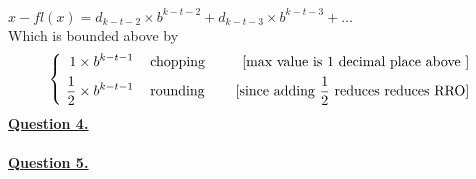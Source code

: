 \documentclass[12pt]{article}
\begin{document}
$x - fl(x) = d_{k-t-2} \times b^{k-t-2} + d_{k-t-3} \times b^{k-t-3} + \ldots $\\
Which is bounded above by $$
	\left\{
	\begin{aligned}
		\ 1 \times b^{k-t-1}           & \hspace*{3mm}\text{ chopping } & \hspace*{3mm} \text{[max value is 1 decimal place above ]}            \\
		\ \frac{1}{2} \times b^{k-t-1} & \hspace*{3mm}\text{ rounding } & \hspace*{3mm} \text{[since adding $\frac{1}{2}$ reduces reduces RRO]} \\
	\end{aligned}
	\right.
$$
\newpage
\noindent \hyperlink{toc}{\hypertarget{4}{\LARGE \underline{\textbf{Question 4.}}}}\\\\
\newpage
\noindent \hyperlink{toc}{\hypertarget{5}{\LARGE \underline{\textbf{Question 5.}}}}\\\\
\end{document}
